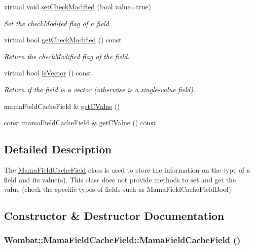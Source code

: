 \begin{DoxyCompactItemize}
virtual void \hyperlink{classWombat_1_1MamaFieldCacheField_a7c8cf837733b67b785dfc6aa21ebec81}{setCheckModified} (bool value=true)
\begin{DoxyCompactList}\small\item\em Set the checkModifed flag of a field. \item\end{DoxyCompactList}\item 
virtual bool \hyperlink{classWombat_1_1MamaFieldCacheField_a214b8aabd992ab44ca37671da73f11b1}{getCheckModified} () const 
\begin{DoxyCompactList}\small\item\em Return the checkModified flag of the field. \item\end{DoxyCompactList}\item 
virtual bool \hyperlink{classWombat_1_1MamaFieldCacheField_aea1bb4b00b1105a05bbda687124da5e3}{isVector} () const 
\begin{DoxyCompactList}\small\item\em Return if the field is a vector (otherwise is a single-\/value field). \item\end{DoxyCompactList}\item 
mamaFieldCacheField \& \hyperlink{classWombat_1_1MamaFieldCacheField_aba5fc4029c002c24f0a47b7a46755752}{getCValue} ()
\item 
const mamaFieldCacheField \& \hyperlink{classWombat_1_1MamaFieldCacheField_ae778bb36d98a120965787d59b71b806c}{getCValue} () const 
\end{DoxyCompactItemize}


\subsection{Detailed Description}
The {\ttfamily \hyperlink{classWombat_1_1MamaFieldCacheField}{MamaFieldCacheField}} class is used to store the information on the type of a field and its value(s). This class does not provide methods to set and get the value (check the specific types of fields such as {\ttfamily MamaFieldCacheFieldBool{\ttfamily ). }}

\subsection{Constructor \& Destructor Documentation}
\hypertarget{classWombat_1_1MamaFieldCacheField_ae8ee6f655d57d6f01ca90573fa292308}{
\subsubsection[{MamaFieldCacheField}]{\setlength{\rightskip}{0pt plus 5cm}Wombat::MamaFieldCacheField::MamaFieldCacheField ()}}
\label{classWombat_1_1MamaFieldCacheField_ae8ee6f655d57d6f01ca90573fa292308}


